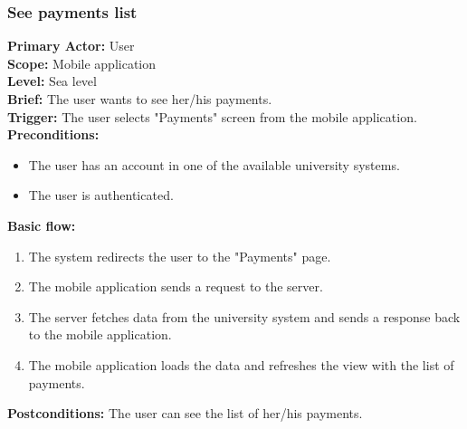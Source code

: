 \subsubsection{\large{See payments list}}
\textbf{Primary Actor:} User\\
\textbf{Scope:} Mobile application\\
\textbf{Level:} Sea level\\
\textbf{Brief:} The user wants to see her/his payments.\\
\textbf{Trigger:} The user selects "Payments" screen from the mobile application.\\
\textbf{Preconditions:}
\begin{itemize}
    \item The user has an account in one of the available university systems.
    \item The user is authenticated.
\end{itemize}
\textbf{Basic flow:}
\begin{enumerate}
    \item The system redirects the user to the "Payments" page.
    \item The mobile application sends a request to the server.
    \item The server fetches data from the university system and sends a response back to the mobile application.
    \item The mobile application loads the data and refreshes the view with the list of payments.
\end{enumerate}
\textbf{Postconditions:}
The user can see the list of her/his payments.


